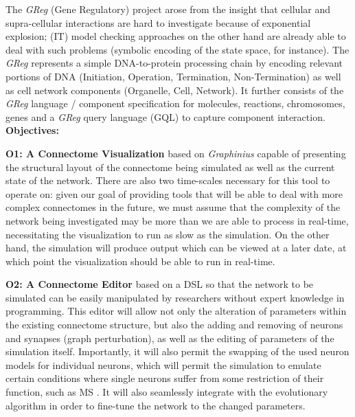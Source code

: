 \documentclass[a4paper,11pt]{article}
\begin{document}
The \emph{GReg} (Gene Regulatory) project \citep{Sedlmajer2012Greg} arose from the insight that cellular and supra-cellular interactions are hard to investigate because of exponential explosion; (IT) model checking approaches on the other hand are already able to deal with such problems (symbolic encoding of the state space, for instance). The \emph{GReg} represents a simple DNA-to-protein processing chain by encoding relevant portions of DNA (Initiation, Operation, Termination, Non-Termination) as well as cell network components (Organelle, Cell, Network). It further consists of the \emph{GReg} language / component specification for molecules, reactions, chromosomes, genes and a \emph{GReg} query language (GQL) to capture component interaction.
\\[0,2cm]


\textbf{Objectives:}

\textbf{O1: A Connectome Visualization} based on \emph{Graphinius} capable of presenting the structural layout of the connectome being simulated as well as the current state of the network. There are also two time-scales necessary for this tool to operate on: given our goal of providing tools that will be able to deal with more complex connectomes in the future, we must assume that the complexity of the network being investigated may be more than we are able to process in real-time, necessitating the visualization to run as slow as the simulation. On the other hand, the simulation will produce output which can be viewed at a later date, at which point the visualization should be able to run in real-time.

\textbf{O2: A Connectome Editor} based on a DSL so that the network to be simulated can be easily manipulated by researchers without expert knowledge in programming. This editor will allow not only the alteration of parameters within the existing connectome structure, but also the adding and removing of neurons and synapses (graph perturbation), as well as the editing of parameters of the simulation itself. Importantly, it will also permit the swapping of the used neuron models for individual neurons, which will permit the simulation to emulate certain conditions where single neurons suffer from some restriction of their function, such as MS \citep{Hauser2006}. It will also seamlessly integrate with the evolutionary algorithm in order to fine-tune the network to the changed parameters.
\\[0,2cm]

\end{document}
